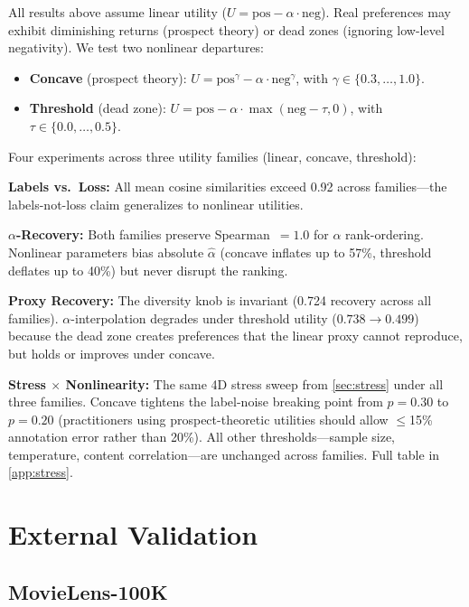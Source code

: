 \documentclass[11pt,letterpaper]{article}
\begin{document}
All results above assume linear utility ($U = \text{pos} - \alpha
\cdot \text{neg}$). Real preferences may exhibit diminishing returns
(prospect theory) or dead zones (ignoring low-level negativity). We
test two nonlinear departures:

\begin{itemize}
  \item \textbf{Concave} (prospect theory): $U = \text{pos}^\gamma -
    \alpha \cdot \text{neg}^\gamma$, with $\gamma \in \{0.3, \ldots, 1.0\}$.
  \item \textbf{Threshold} (dead zone): $U = \text{pos} - \alpha
    \cdot \max(\text{neg} - \tau, 0)$, with $\tau \in \{0.0, \ldots, 0.5\}$.
\end{itemize}

Four experiments across three utility families (linear, concave,
threshold):

\textbf{Labels vs.\ Loss:} All mean cosine similarities
exceed 0.92 across families---the labels-not-loss claim generalizes
to nonlinear utilities.

\textbf{$\alpha$-Recovery:} Both families preserve
Spearman~$= 1.0$ for $\alpha$ rank-ordering. Nonlinear parameters
bias absolute $\hat\alpha$ (concave inflates up to 57\%, threshold
deflates up to 40\%) but never disrupt the ranking.

\textbf{Proxy Recovery:} The diversity knob is invariant
(0.724 recovery across all families). $\alpha$-interpolation degrades
under threshold utility ($0.738 \to 0.499$) because the dead zone
creates preferences that the linear proxy cannot reproduce, but holds
or improves under concave.

\textbf{Stress $\times$ Nonlinearity:} The same 4D stress
sweep from \cref{sec:stress} under all three families. Concave
tightens the label-noise breaking point from $p = 0.30$ to $p = 0.20$
(practitioners using prospect-theoretic utilities should allow
$\leq$15\% annotation error rather than 20\%). All other
thresholds---sample size, temperature, content correlation---are
unchanged across families. Full table in \cref{app:stress}.

\section{External Validation}
\label{sec:validation}

\subsection{MovieLens-100K}
\end{document}
